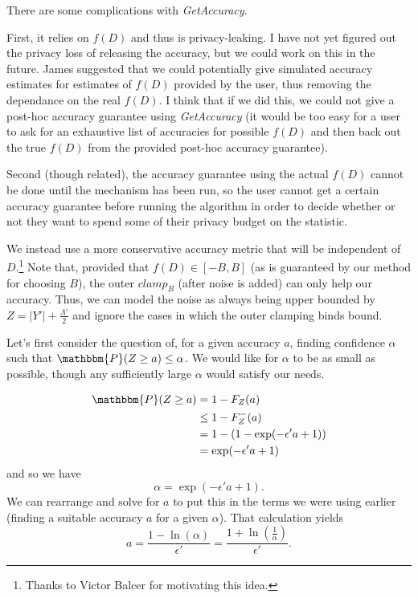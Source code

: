 \documentclass[11pt]{scrartcl} %
\begin{document}
There are some complications with \emph{GetAccuracy}. \newline

First, it relies on $f(D)$ and thus is privacy-leaking. I have not yet figured out the privacy loss of releasing the accuracy,
but we could work on this in the future. James suggested that we could potentially give simulated accuracy estimates
for estimates of $f(D)$ provided by the user, thus removing the dependance on the real $f(D)$.
I think that if we did this, we could not give a post-hoc accuracy guarantee using \emph{GetAccuracy}
(it would be too easy for a user to ask for an exhaustive list of accuracies for possible $f(D)$ and then back out the true
$f(D)$ from the provided post-hoc accuracy guarantee). \newline

Second (though related), the accuracy guarantee using the actual $f(D)$ cannot be done until the mechanism has been run,
so the user cannot get a certain accuracy guarantee before running the algorithm in order to decide whether or
not they want to spend some of their privacy budget on the statistic. \newline

We instead use a more conservative accuracy metric that will be independent of $D$.\footnote{Thanks to Victor Balcer for motivating
this idea.} Note that, provided that $f(D) \in [-B, B]$ (as is guaranteed by our method for choosing $B$),
the outer $clamp_B$ (after noise is added) can only help our accuracy. Thus, we can model the noise as always being upper bounded by
$Z = \vert Y' \vert + \frac{\Lambda'}{2}$ and ignore the cases in which the outer clamping binds bound. \newline

Let's first consider the question of, for a given accuracy $a$, finding confidence $\alpha$ such that
$\mathbbm{P}(Z \geq a) \leq \alpha$. We would like for $\alpha$ to be as small as possible, though any sufficiently large
$\alpha$ would satisfy our needs.

\begin{align*}
	\mathbbm{P}(Z \geq a) &= 1 - F_{Z}(a) \\
						  &\leq 1 - F_{Z}^{-}(a) \\
						  &= 1 - (1 - \exp(-\epsilon' a + 1)) \\
						  &= \exp(-\epsilon' a + 1)
\end{align*}
and so we have
\[ \alpha = \exp(-\epsilon' a + 1). \]
We can rearrange and solve for $a$ to put this in the terms we were using earlier (finding a suitable accuracy $a$ for
a given $\alpha$). That calculation yields
\[ a = \frac{1 - \ln(\alpha)}{\epsilon'} = \frac{1 + \ln \left( \frac{1}{\alpha} \right)}{\epsilon'}. \]
\end{document}
